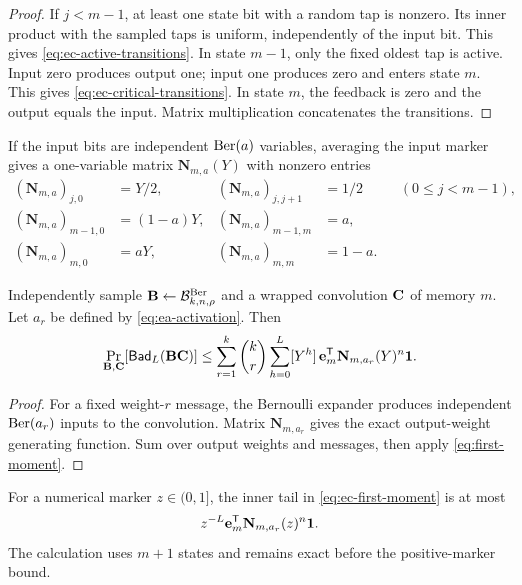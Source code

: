 \begin{proof}
If $j<m-1$, at least one state bit with a random tap is nonzero.  Its inner
product with the sampled taps is uniform, independently of the input bit.
This gives \eqref{eq:ec-active-transitions}.  In state $m-1$, only the fixed
oldest tap is active.  Input zero produces output one; input one produces zero
and enters state $m$.  This gives \eqref{eq:ec-critical-transitions}.  In
state $m$, the feedback is zero and the output equals the input.  Matrix
multiplication concatenates the transitions.
\end{proof}

If the input bits are independent $\operatorname{Ber}(a)$ variables, averaging the input
marker gives a one-variable matrix $\mathbf N_{m,a}(Y)$ with nonzero entries
\begin{align}
 (\mathbf N_{m,a})_{j,0}&=Y/2,&
 (\mathbf N_{m,a})_{j,j+1}&=1/2
 &&(0\leq j<m-1),
 \label{eq:ec-ber-active}\\
 (\mathbf N_{m,a})_{m-1,0}&=(1-a)Y,&
 (\mathbf N_{m,a})_{m-1,m}&=a,
 \label{eq:ec-ber-critical}\\
 (\mathbf N_{m,a})_{m,0}&=aY,&
 (\mathbf N_{m,a})_{m,m}&=1-a.
 \label{eq:ec-ber-zero}
\end{align}

\begin{theorem}
\label{thm:ec-exact-first-moment}
Independently sample
$\mathbf B\gets\mathcal B^{\mathrm{Ber}}_{k,n,\rho}$ and a wrapped convolution
$\mathbf C$ of memory $m$.  Let $a_r$ be defined by \eqref{eq:ea-activation}.  Then
\begin{equation}
 \Pr_{\mathbf B,\mathbf C}[\mathsf{Bad}_L(\mathbf B\mathbf C)]
 \leq
 \sum_{r=1}^{k}\binom{k}{r}
 \sum_{h=0}^{L}[Y^h]\,
 \mathbf e_m^{\mathsf T}\mathbf N_{m,a_r}(Y)^n\mathbf 1.
 \label{eq:ec-first-moment}
\end{equation}
\end{theorem}

\begin{proof}
For a fixed weight-$r$ message, the Bernoulli expander produces independent
$\operatorname{Ber}(a_r)$ inputs to the convolution.  Matrix $\mathbf N_{m,a_r}$ gives the
exact output-weight generating function.  Sum over output weights and
messages, then apply \eqref{eq:first-moment}.
\end{proof}

For a numerical marker $z\in(0,1]$, the inner tail in
\eqref{eq:ec-first-moment} is at most
\begin{equation}
 z^{-L}\mathbf e_m^{\mathsf T}\mathbf N_{m,a_r}(z)^n\mathbf 1.
 \label{eq:ec-marker-bound}
\end{equation}
The calculation uses $m+1$ states and remains exact before the positive-marker
bound.

